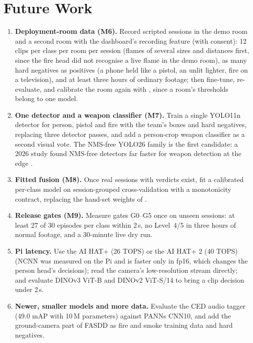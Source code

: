 \section{Future Work}
\begin{enumerate}
\item \textbf{Deployment-room data (M6).} Record scripted sessions in the demo room and a second room with the dashboard's recording feature (with consent): 12 clips per class per room per session (flames of several sizes and distances first, since the fire head did not recognise a live flame in the demo room), as many hard negatives as positives (a phone held like a pistol, an unlit lighter, fire on a television), and at least three hours of ordinary footage; then fine-tune, re-evaluate, and calibrate the room again with , since a room's thresholds belong to one model.
\item \textbf{One detector and a weapon classifier (M7).} Train a single YOLO11n detector for person, pistol and fire with the team's boxes and hard negatives, replacing three detector passes, and add a person-crop weapon classifier as a second visual vote. The NMS-free YOLO26 family \cite{jocher2026yolo26} is the first candidate: a 2026 study found NMS-free detectors far faster for weapon detection at the edge \cite{fierrosilva2026yolo26weapon}.
\item \textbf{Fitted fusion (M8).} Once real sessions with verdicts exist, fit a calibrated per-class model on session-grouped cross-validation with a monotonicity contract, replacing the hand-set weights of .
\item \textbf{Release gates (M9).} Measure gates G0--G5 once on unseen sessions: at least 27 of 30 episodes per class within 2\,s, no Level~4/5 in three hours of normal footage, and a 30-minute live dry run.
\item \textbf{Pi latency.} Use the AI HAT+ (26 TOPS) or the AI HAT+ 2 (40 TOPS) \cite{rpi2024aihat, rpi2026aihat2} (NCNN was measured on the Pi and is faster only in fp16, which changes the person head's decisions); read the camera's low-resolution stream directly; and evaluate DINOv3 ViT-B \cite{simeoni2025dinov3} and DINOv2 ViT-S/14 to bring a clip decision under 2\,s.
\item \textbf{Newer, smaller models and more data.} Evaluate the CED audio tagger (49.0 mAP with 10\,M parameters) \cite{dinkel2024ced} against PANNs CNN10, and add the ground-camera part of FASDD \cite{wang2025fasdd} as fire and smoke training data and hard negatives.

\end{enumerate}
